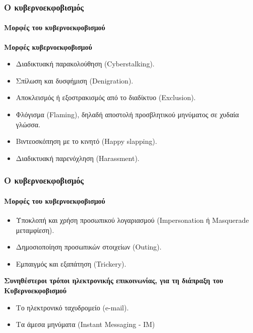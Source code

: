 \documentclass[hyperref={pdfpagelabels=false}, t]{beamer}
\let\olditem=\item%
\renewcommand{\item}{\olditem \justifying}%
\begin{document}
%
%

\begin{frame}[t]
\frametitle{Ο κυβερνοεκφοβισμός}
\vspace{10pt}
\framesubtitle{Μορφές του κυβερνοεκφοβισμού}
\vspace{-18.5pt}
\begin{adjustwidth}{-0.7cm}{}
\justifying
\begin{list}{\quad}{}
\item \textbf{Μορφές κυβερνοεκφοβισμού}
\end{list}
\begin{itemize}
  \item Διαδικτυακή παρακολούθηση (Cyberstalking). \setlength{\itemsep}{15pt}
  \item Σπίλωση και δυσφήμιση (Denigration). \setlength{\itemsep}{15pt}
  \item Αποκλεισμός ή εξοστρακισμός από το διαδίκτυο (Exclusion).   \setlength{\itemsep}{15pt} 
  \item Φλόγισμα (Flaming), δηλαδή αποστολή προσβλητικού μηνύματος σε χυδαία  
  γλώσσα. \setlength{\itemsep}{15pt} 
  \item Βιντεοσκόπηση με το κινητό (Happy slapping). \setlength{\itemsep}{15pt}
  \item Διαδικτυακή παρενόχληση (Harassment). \setlength{\itemsep}{15pt}

\end{itemize}
\end{adjustwidth}
\end{frame}

%
%

\begin{frame}[t]
\frametitle{Ο κυβερνοεκφοβισμός}
\vspace{10pt}
\framesubtitle{Μορφές του κυβερνοεκφοβισμού}
\vspace{-18.5pt}
\begin{adjustwidth}{-0.7cm}{}
\justifying
\begin{itemize}
  \item Υποκλοπή και χρήση προσωπικού λογαριασμού (Impersonation ή Masquerade
  μεταμφίεση). \setlength{\itemsep}{15pt} 
  \item Δημοσιοποίηση προσωπικών στοιχείων (Outing).  \setlength{\itemsep}{15pt}
  \item Εμπαιγμός και εξαπάτηση (Trickery). \setlength{\itemsep}{15pt}
\end{itemize}
\begin{list}{\quad}{}
\item \textbf{Συνηθέστεροι τρόποι ηλεκτρονικής επικοινωνίας, για τη διάπραξη του
Kυβερνοεκφοβισμού}
\end{list}
\begin{itemize}
  \item Το ηλεκτρονικό ταχυδρομείο (e-mail).  \setlength{\itemsep}{15pt} 
  \item Tα άμεσα μηνύματα (Instant Messaging - IM)  \setlength{\itemsep}{15pt} 
\end{itemize}
\end{adjustwidth}
\end{frame}
\end{document}
